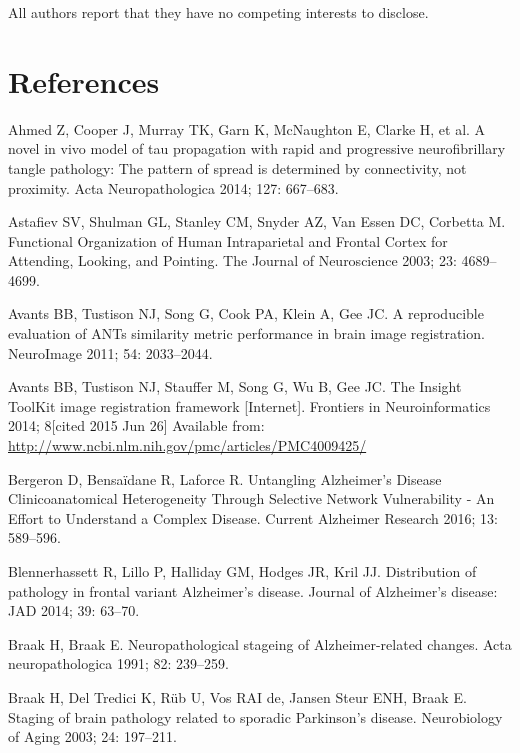 \documentclass[]{article}
\begin{document}
All authors report that they have no competing interests to disclose.

\section*{References}\label{references}

\hypertarget{refs}{}
\hypertarget{ref-ahmed_novel_2014}{}
Ahmed Z, Cooper J, Murray TK, Garn K, McNaughton E, Clarke H, et al. A
novel in vivo model of tau propagation with rapid and progressive
neurofibrillary tangle pathology: The pattern of spread is determined by
connectivity, not proximity. Acta Neuropathologica 2014; 127: 667--683.

\hypertarget{ref-astafiev_functional_2003}{}
Astafiev SV, Shulman GL, Stanley CM, Snyder AZ, Van Essen DC, Corbetta
M. Functional Organization of Human Intraparietal and Frontal Cortex for
Attending, Looking, and Pointing. The Journal of Neuroscience 2003; 23:
4689--4699.

\hypertarget{ref-avants_reproducible_2011}{}
Avants BB, Tustison NJ, Song G, Cook PA, Klein A, Gee JC. A reproducible
evaluation of ANTs similarity metric performance in brain image
registration. NeuroImage 2011; 54: 2033--2044.

\hypertarget{ref-avants_insight_2014}{}
Avants BB, Tustison NJ, Stauffer M, Song G, Wu B, Gee JC. The Insight
ToolKit image registration framework {[}Internet{]}. Frontiers in
Neuroinformatics 2014; 8{[}cited 2015 Jun 26{]} Available from:
\url{http://www.ncbi.nlm.nih.gov/pmc/articles/PMC4009425/}

\hypertarget{ref-bergeron_untangling_2016}{}
Bergeron D, Bensaïdane R, Laforce R. Untangling Alzheimer's Disease
Clinicoanatomical Heterogeneity Through Selective Network Vulnerability
- An Effort to Understand a Complex Disease. Current Alzheimer Research
2016; 13: 589--596.

\hypertarget{ref-blennerhassett_distribution_2014}{}
Blennerhassett R, Lillo P, Halliday GM, Hodges JR, Kril JJ. Distribution
of pathology in frontal variant Alzheimer's disease. Journal of
Alzheimer's disease: JAD 2014; 39: 63--70.

\hypertarget{ref-braak_neuropathological_1991}{}
Braak H, Braak E. Neuropathological stageing of Alzheimer-related
changes. Acta neuropathologica 1991; 82: 239--259.

\hypertarget{ref-braak_staging_2003}{}
Braak H, Del Tredici K, Rüb U, Vos RAI de, Jansen Steur ENH, Braak E.
Staging of brain pathology related to sporadic Parkinson's disease.
Neurobiology of Aging 2003; 24: 197--211.
\end{document}

